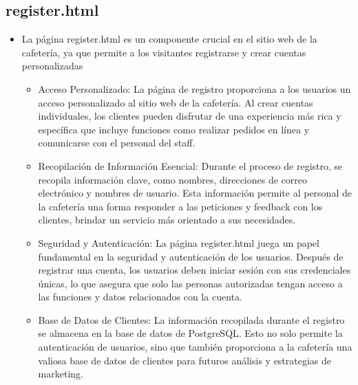 \documentclass{article}
\begin{document}
	
 \subsection{register.html}
	\begin{itemize}
  \item  La página register.html es un componente crucial en el sitio web de la cafetería, ya que permite a los visitantes registrarse y crear cuentas personalizadas
		\begin{itemize}
	  \item  Acceso Personalizado: La página de registro proporciona a los usuarios un acceso personalizado al sitio web de la cafetería. Al crear cuentas individuales, los clientes pueden disfrutar de una experiencia más rica y específica que incluye funciones como realizar pedidos en línea y comunicarse con el personal del staff.
	   \item  Recopilación de Información Esencial: Durante el proceso de registro, se recopila información clave, como nombres, direcciones de correo electrónico y nombres de usuario. Esta información permite al personal de la cafetería una forma responder a las peticiones y feedback con los clientes, brindar un servicio más orientado a sus necesidades.
	   \item  Seguridad y Autenticación: La página register.html juega un papel fundamental en la seguridad y autenticación de los usuarios. Después de registrar una cuenta, los usuarios deben iniciar sesión con sus credenciales únicas, lo que asegura que solo las personas autorizadas tengan acceso a las funciones y datos relacionados con la cuenta.
	   \item  Base de Datos de Clientes: La información recopilada durante el registro se almacena en la base de datos de PostgreSQL. Esto no solo permite la autenticación de usuarios, sino que también proporciona a la cafetería una valiosa base de datos de clientes para futuros análisis y estrategias de marketing.
			
   
		\end{itemize}
	\end{itemize}
\end{document}
